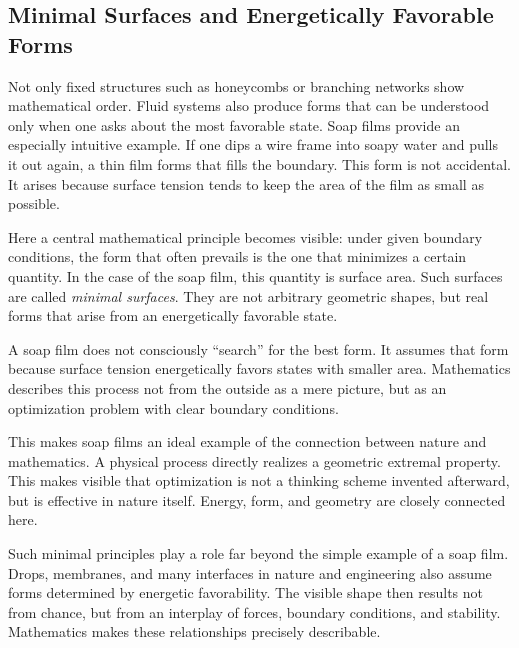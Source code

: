 
\subsection{Minimal Surfaces and Energetically Favorable Forms}

Not only fixed structures such as honeycombs or branching networks show mathematical order.
Fluid systems also produce forms
that can be understood only
when one asks about the most favorable state.
Soap films provide an especially intuitive example.
If one dips a wire frame into soapy water
and pulls it out again,
a thin film forms
that fills the boundary.
This form is not accidental.
It arises
because surface tension tends to keep the area of the film as small as possible.

Here a central mathematical principle becomes visible:
under given boundary conditions,
the form that often prevails
is the one that minimizes a certain quantity.
In the case of the soap film, this quantity is surface area.
Such surfaces are called \emph{minimal surfaces}.
They are not arbitrary geometric shapes,
but real forms
that arise from an energetically favorable state.

\begin{DidacticBox}
	\label{box:soapfilm}
	A soap film does not consciously ``search'' for the best form.
	It assumes that form
	because surface tension energetically favors states with smaller area.
	Mathematics describes this process not from the outside as a mere picture,
	but as an optimization problem with clear boundary conditions.
\end{DidacticBox}

This makes soap films an ideal example
of the connection between nature and mathematics.
A physical process directly realizes a geometric extremal property.
This makes visible
that optimization is not a thinking scheme invented afterward,
but is effective in nature itself.
Energy,
form,
and geometry are closely connected here.

Such minimal principles play a role far beyond the simple example of a soap film.
Drops,
membranes,
and many interfaces in nature and engineering
also assume forms
determined by energetic favorability.
The visible shape then results not from chance,
but from an interplay of forces,
boundary conditions,
and stability.
Mathematics makes these relationships precisely describable.

